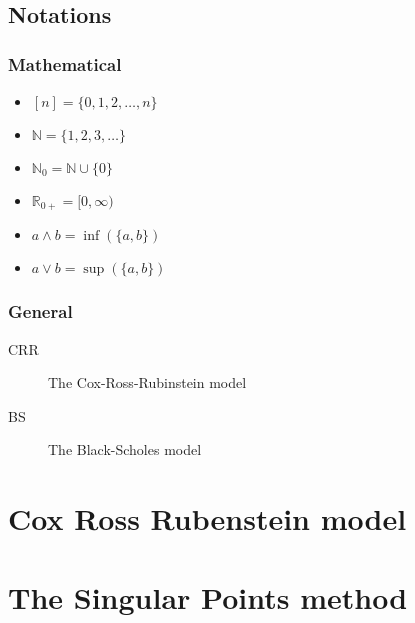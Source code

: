 \documentclass[12pt,a4paper]{amsbook}
\begin{document}



\tableofcontents
\clearpage


\section*{Notations}

\subsection*{Mathematical}
\begin{itemize}
\item $ [n] = \{0, 1, 2, \dots, n\} $
\item $ \mathbb{N} = \{ 1, 2, 3, \dots \} $
\item $ \mathbb{N}_0 = \mathbb{N} \cup \{ 0 \} $
\item $ \mathbb{R}_{0+} = [0, \infty) $
\item $ a \wedge b = \inf(\{ a, b \}) $
\item $ a \vee b = \sup(\{ a, b \}) $
\end{itemize}

\subsection*{General}
\begin{description}
	\item[CRR] The Cox-Ross-Rubinstein model
	\item[BS] The Black-Scholes model
\end{description}


\chapter{Cox Ross Rubenstein model}
\label{cha:crr}



%


\chapter{The Singular Points method}
\label{cha:sp}



% 
\printbibliography
\end{document}
